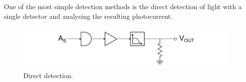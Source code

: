 \begin{bibunit}[plain]
One of the most simple detection methods is the direct detection of light with a single detector and analysing the resulting photocurrent.
\cite{hans2004}
\begin{figure}[H]
	\label{fig:detection_direct}
	\centering
	\includegraphics{./sdf/optical_detection/figures/detection-direct.pdf}
	\caption{Direct detection.}
\end{figure}




\end{bibunit}
